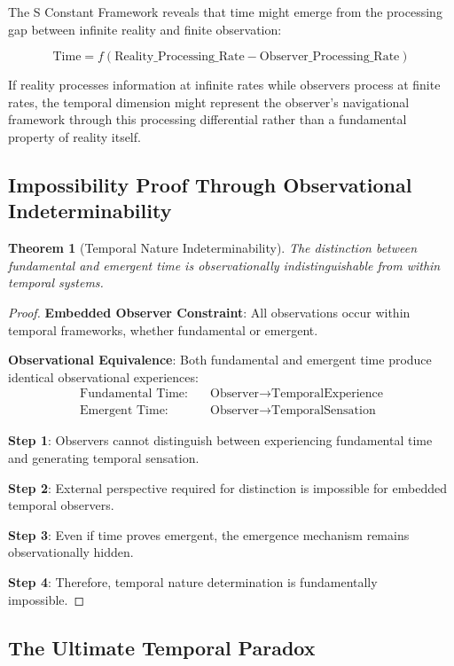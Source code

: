 \documentclass[12pt,a4paper]{article}
\newtheorem{theorem}{Theorem}[section]
\begin{document}
The S Constant Framework reveals that time might emerge from the processing gap between infinite reality and finite observation:

$$\text{Time} = f(\text{Reality\_Processing\_Rate} - \text{Observer\_Processing\_Rate})$$

If reality processes information at infinite rates while observers process at finite rates, the temporal dimension might represent the observer's navigational framework through this processing differential rather than a fundamental property of reality itself.

\subsection{Impossibility Proof Through Observational Indeterminability}

\begin{theorem}[Temporal Nature Indeterminability]
The distinction between fundamental and emergent time is observationally indistinguishable from within temporal systems.
\end{theorem}

\begin{proof}
\textbf{Embedded Observer Constraint}: All observations occur within temporal frameworks, whether fundamental or emergent.

\textbf{Observational Equivalence}: Both fundamental and emergent time produce identical observational experiences:
\begin{align}
\text{Fundamental Time:} \quad &\text{Observer} \to \text{TemporalExperience} \\
\text{Emergent Time:} \quad &\text{Observer} \to \text{TemporalSensation}
\end{align}

\textbf{Step 1}: Observers cannot distinguish between experiencing fundamental time and generating temporal sensation.

\textbf{Step 2}: External perspective required for distinction is impossible for embedded temporal observers.

\textbf{Step 3}: Even if time proves emergent, the emergence mechanism remains observationally hidden.

\textbf{Step 4}: Therefore, temporal nature determination is fundamentally impossible.
\end{proof}

\subsection{The Ultimate Temporal Paradox}
\end{document}
